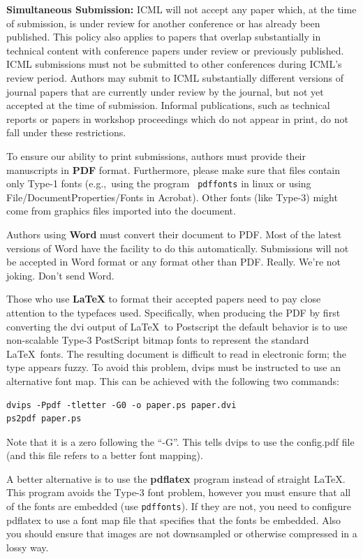 \documentclass{article}
\begin{document}
{\bf Simultaneous Submission:} ICML will not accept any paper which,
at the time of submission, is under review for another conference or
has already been published. This policy also applies to papers that
overlap substantially in technical content with conference papers
under review or previously published. ICML submissions must not be
submitted to other conferences during ICML's review period. Authors
may submit to ICML substantially different versions of journal papers
that are currently under review by the journal, but not yet accepted
at the time of submission. Informal publications, such as technical
reports or papers in workshop proceedings which do not appear in
print, do not fall under these restrictions.

\medskip

To ensure our ability to print submissions, authors must provide their
manuscripts in \textbf{PDF} format.  Furthermore, please make sure
that files contain only Type-1 fonts (e.g.,~using the program {\tt
  pdffonts} in linux or using File/DocumentProperties/Fonts in
Acrobat).  Other fonts (like Type-3) might come from graphics files
imported into the document.

Authors using \textbf{Word} must convert their document to PDF.  Most
of the latest versions of Word have the facility to do this
automatically.  Submissions will not be accepted in Word format or any
format other than PDF. Really. We're not joking. Don't send Word.

Those who use \textbf{\LaTeX} to format their accepted papers need to pay close
attention to the typefaces used.  Specifically, when producing the PDF by first
converting the dvi output of \LaTeX\ to Postscript the default behavior is to
use non-scalable Type-3 PostScript bitmap fonts to represent the standard
\LaTeX\ fonts. The resulting document is difficult to read in electronic form;
the type appears fuzzy. To avoid this problem, dvips must be instructed to use
an alternative font map.  This can be achieved with the following two commands:

{\footnotesize
\begin{verbatim}
dvips -Ppdf -tletter -G0 -o paper.ps paper.dvi
ps2pdf paper.ps
\end{verbatim}}
Note that it is a zero following the ``-G''.  This tells dvips to use
the config.pdf file (and this file refers to a better font mapping).

A better alternative is to use the \textbf{pdflatex} program instead of
straight \LaTeX. This program avoids the Type-3 font problem, however you must
ensure that all of the fonts are embedded (use {\tt pdffonts}). If they are
not, you need to configure pdflatex to use a font map file that specifies that
the fonts be embedded. Also you should ensure that images are not downsampled
or otherwise compressed in a lossy way.
\end{document}
